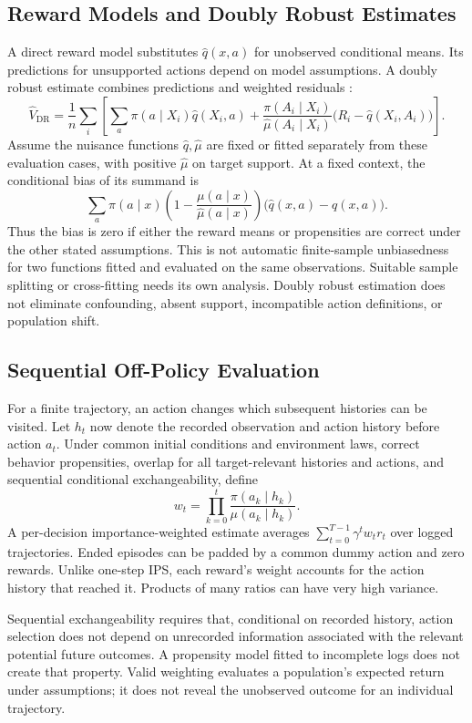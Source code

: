 \subsection{Reward Models and Doubly Robust Estimates}

A direct reward model substitutes $\hat q(x,a)$ for unobserved conditional means. Its predictions for unsupported actions depend on model assumptions. A doubly robust estimate combines predictions and weighted residuals \citep{dudik2011doublyrobust}:
\[
\hat V_{\mathrm{DR}}=\frac1n\sum_i
\left[
\sum_a\pi(a\mid X_i)\hat q(X_i,a)
+\frac{\pi(A_i\mid X_i)}{\hat\mu(A_i\mid X_i)}
\bigl(R_i-\hat q(X_i,A_i)\bigr)
\right].
\]
Assume the nuisance functions $\hat q,\hat\mu$ are fixed or fitted separately from these evaluation cases, with positive $\hat\mu$ on target support. At a fixed context, the conditional bias of its summand is
\[
\sum_a\pi(a\mid x)
\left(1-\frac{\mu(a\mid x)}{\hat\mu(a\mid x)}\right)
\bigl(\hat q(x,a)-q(x,a)\bigr).
\]
Thus the bias is zero if either the reward means or propensities are correct under the other stated assumptions. This is not automatic finite-sample unbiasedness for two functions fitted and evaluated on the same observations. Suitable sample splitting or cross-fitting needs its own analysis. Doubly robust estimation does not eliminate confounding, absent support, incompatible action definitions, or population shift.

\subsection{Sequential Off-Policy Evaluation}

For a finite trajectory, an action changes which subsequent histories can be visited. Let $h_t$ now denote the recorded observation and action history before action $a_t$. Under common initial conditions and environment laws, correct behavior propensities, overlap for all target-relevant histories and actions, and sequential conditional exchangeability, define
\[
w_t=\prod_{k=0}^{t}
\frac{\pi(a_k\mid h_k)}{\mu(a_k\mid h_k)}.
\]
A per-decision importance-weighted estimate averages $\sum_{t=0}^{T-1}\gamma^t w_t r_t$ over logged trajectories. Ended episodes can be padded by a common dummy action and zero rewards. Unlike one-step IPS, each reward's weight accounts for the action history that reached it. Products of many ratios can have very high variance.

Sequential exchangeability requires that, conditional on recorded history, action selection does not depend on unrecorded information associated with the relevant potential future outcomes. A propensity model fitted to incomplete logs does not create that property. Valid weighting evaluates a population's expected return under assumptions; it does not reveal the unobserved outcome for an individual trajectory.


